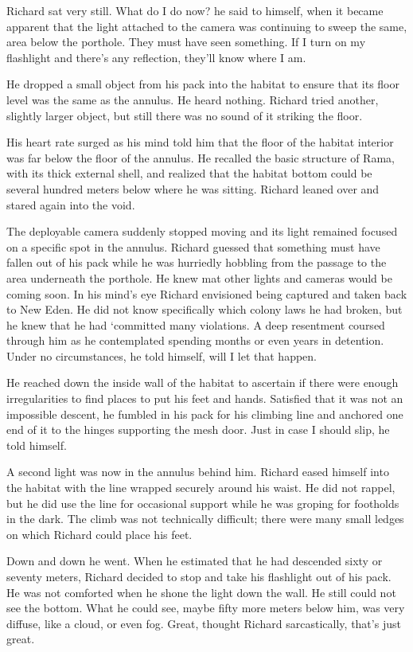 \documentclass[]{article}
\begin{document}
{Richard sat very still. What do I do now? he said to himself, when it became apparent that the light attached to the camera was continuing to sweep the same, area below the porthole. They must have seen something. If I turn on my flashlight and there’s any reflection, they’ll know where I am.

He dropped a small object from his pack into the habitat to ensure that its floor level was the same as the annulus. He heard nothing. Richard tried another, slightly larger object, but still there was no sound of it striking the floor.

His heart rate surged as his mind told him that the floor of the habitat interior was far below the floor of the annulus. He recalled the basic structure of Rama, with its thick external shell, and realized that the habitat bottom could be several hundred meters below where he was sitting. Richard leaned over and stared again into the void.

The deployable camera suddenly stopped moving and its light remained focused on a specific spot in the annulus. Richard guessed that something must have fallen out of his pack while he was hurriedly hobbling from the passage to the area underneath the porthole. He knew mat other lights and cameras would be coming soon. In his mind’s eye Richard envisioned being captured and taken back to New Eden. He did not know specifically which colony laws he had broken, but he knew that he had ‘committed many violations. A deep resentment coursed through him as he contemplated spending months or even years in detention. Under no circumstances, he told himself, will I let that happen.

He reached down the inside wall of the habitat to ascertain if there were enough irregularities to find places to put his feet and hands. Satisfied that it was not an impossible descent, he fumbled in his pack for his climbing line and anchored one end of it to the hinges supporting the mesh door. Just in case I should slip, he told himself.

A second light was now in the annulus behind him. Richard eased himself into the habitat with the line wrapped securely around his waist. He did not rappel, but he did use the line for occasional support while he was groping for footholds in the dark. The climb was not technically difficult; there were many small ledges on which Richard could place his feet.

Down and down he went. When he estimated that he had descended sixty or seventy meters, Richard decided to stop and take his flashlight out of his pack. He was not comforted when he shone the light down the wall. He still could not see the bottom. What he could see, maybe fifty more meters below him, was very diffuse, like a cloud, or even fog. Great, thought Richard sarcastically, that’s just great.

}
\end{document}
